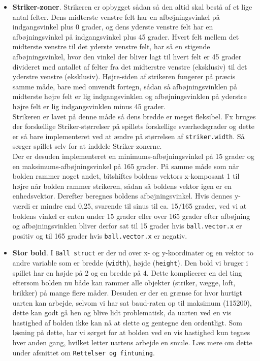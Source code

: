 \begin{itemize}
\item \textbf{Striker-zoner}. Strikeren er opbygget sådan så den altid skal bestå af et lige antal felter. Dens midterste venstre felt har en afbøjningsvinkel på indgangsvinkel plus 0 grader, og dens yderste venstre felt har en afbøjningsvinkel på indgangsvinkel plus 45 grader. Hvert felt mellem det midterste venstre til det yderste venstre felt, har så en stigende afbøjningsvinkel, hvor den vinkel der bliver lagt til hvert felt er 45 grader divideret med antallet af felter fra det midterstre venstre (eksklusiv) til det yderstre venstre (eksklusiv). Højre-siden af strikeren fungerer på præcis samme måde, bare med omvendt fortegn, sådan så afbøjningsvinklen på midterste højre felt er lig indgangsvinklen og afbøjningsvinklen på yderstre højre felt er lig indgangsvinklen minus 45 grader.\\
Strikeren er lavet på denne måde så dens bredde er meget fleksibel. Fx bruges der forskellige Striker-størrelser på spillets forskellige sværhedsgrader og dette er så bare implementeret ved at ændre på størrelsen af \texttt{striker.width}. Så sørger spillet selv for at inddele Striker-zonerne. \\

Der er desuden implementeret en minimums-afbøjningsvinkel på 15 grader og en maksimums-afbøjningsvinkel på 165 grader. På samme måde som når bolden rammer noget andet, bitshiftes boldens vektors x-komposant 1 til højre når bolden rammer strikeren, sådan så boldens vektor igen er en enhedsvektor. Derefter beregnes boldens afbøjningsvinkel. Hvis dennes y-værdi er mindre end 0,25, svarende til sinus til ca. 15/165 grader, ved vi at boldens vinkel er enten under 15 grader eller over 165 grader efter afbøjning og afbøjningsvinklen bliver derfor sat til 15 grader hvis \texttt{ball.vector.x} er positiv og til 165 grader hvis \texttt{ball.vector.x} er negativ.

\item \textbf{Stor bold}. I \texttt{Ball struct} er der ud over x- og y-koordinater og en vektor to andre variable som er bredde (\texttt{width}), højde (\texttt{height}). Den bold vi bruger i spillet har en højde på 2 og en bredde på 4. Dette komplicerer en del ting eftersom bolden nu både kan rammer alle objekter (striker, vægge, loft, brikker) på mange flere måder. Desuden er der en grænse for hvor hurtigt uarten kan arbejde, selvom vi har sat baud-raten op til maksimum (115200), dette kan godt gå hen og blive lidt problematisk, da uarten ved en vis hastighed af bolden ikke kan nå at slette og gentegne den ordentligt. Som løsning på dette, har vi sørget for at bolden ved en vis hastighed kun tegnes hver anden gang, hvilket letter uartens arbejde en smule. Læs mere om dette under  afsnittet om \texttt{Rettelser og fintuning}.


\end{itemize}
